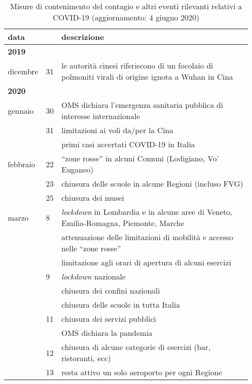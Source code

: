 \begin{table}[ht]
    \centering
    \caption[Misure di contenimento del contagio e altri eventi rilevanti relativi a COVID-19]{Misure di contenimento del contagio e altri eventi rilevanti relativi a COVID-19 (aggiornamento: 4 giugno 2020)}
    \begin{tabular}{lll}
    \toprule
    \multicolumn{2}{l}{data} & descrizione \\
    \midrule
    \textbf{2019} &&\\
        dicembre    & 31 & le autorità cinesi riferiscono di un focolaio di polmoniti virali di origine ignota a Wuhan in Cina\\
    \textbf{2020} &&\\
        gennaio     & 30 & OMS dichiara l'emergenza sanitaria pubblica di interesse internazionale\\
                    & 31 & limitazioni ai voli da/per la Cina \\
                    &    & primi casi accertati COVID-19 in Italia\\
        febbraio    & 22 & ``zone rosse'' in alcuni Comuni (Lodigiano, Vo' Euganeo)\\
                    & 23 & chiusura delle scuole in alcune Regioni (incluso FVG)\\
                    & 25 & chiusura dei musei\\
        marzo       &  8 & \textit{lockdown} in Lombardia e in alcune aree di Veneto, Emilia-Romagna, Piemonte, Marche\\
                    &    & attenuazione delle limitazioni di mobilità e accesso nelle ``zone rosse''\\
                    &    & limitazione agli orari di apertura di alcuni esercizi \\
                    &  9 & \textit{lockdown} nazionale\\
                    &    & chiusura dei confini nazionali\\
                    &    & chiusura delle scuole in tutta Italia\\
                    & 11 & chiusura dei servizi pubblici\\
                    &    & OMS dichiara la pandemia\\
                    & 12 & chiusura di alcune categorie di esercizi (bar, ristoranti, ecc)\\
                    & 13 & resta attivo un solo aeroporto per ogni Regione\\

\end{tabular}
\end{table}

